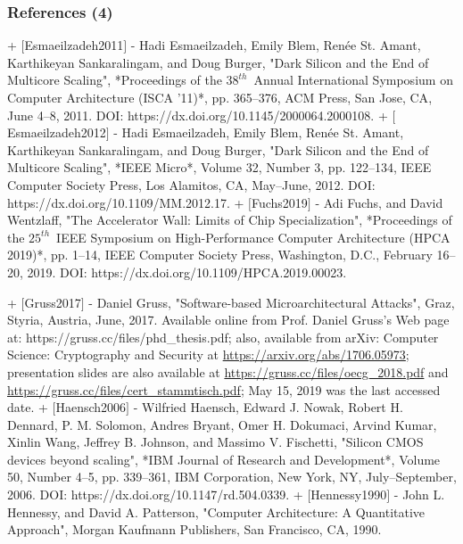 \begin{frame}
	\frametitle{References (4)}

+ $[$Esmaeilzadeh2011$]$
	- Hadi Esmaeilzadeh, Emily Blem, Ren{\'{e}}e {St. Amant}, Karthikeyan Sankaralingam, and Doug Burger, "Dark Silicon and the End of Multicore Scaling", *Proceedings of the $38^{th}$\ Annual International Symposium on Computer Architecture ({ISCA '11})*, pp. 365--376, {ACM} Press, San Jose, {CA}, June 4--8, 2011. DOI: https://dx.doi.org/10.1145/2000064.2000108.
+ $[$Esmaeilzadeh2012$]$
	- Hadi Esmaeilzadeh, Emily Blem, Ren{\'{e}}e {St. Amant}, Karthikeyan Sankaralingam, and Doug Burger, "Dark Silicon and the End of Multicore Scaling", *{IEEE} Micro*, Volume 32, Number 3, pp. 122--134, {IEEE} Computer Society Press, Los Alamitos, {CA}, May--June, 2012. DOI: https://dx.doi.org/10.1109/MM.2012.17.
+ $[$Fuchs2019$]$
	- Adi Fuchs, and David Wentzlaff, "The Accelerator Wall: Limits of Chip Specialization", *Proceedings of the $25^{th}$\ {IEEE} Symposium on High-Performance Computer Architecture ({HPCA} 2019)*, pp. 1--14, {IEEE} Computer Society Press, Washington, {D.C.}, February 16--20, 2019. DOI: https://dx.doi.org/10.1109/HPCA.2019.00023.



+ $[$Gruss2017$]$
	- Daniel Gruss, "Software-based Microarchitectural Attacks", Graz, Styria, Austria, June, 2017. Available online from Prof. Daniel Gruss's Web page at: https://gruss.cc/files/phd_thesis.pdf; also, available from arXiv: Computer Science: Cryptography and Security at \url{https://arxiv.org/abs/1706.05973}; presentation slides are also available at \url{https://gruss.cc/files/oecg_2018.pdf} and \url{https://gruss.cc/files/cert_stammtisch.pdf}; May 15, 2019 was the last accessed date.
+ $[$Haensch2006$]$
	- Wilfried Haensch, Edward J. Nowak, Robert H. Dennard, P. M. Solomon, Andres Bryant, Omer H. Dokumaci, Arvind Kumar, Xinlin Wang, Jeffrey B. Johnson, and Massimo V. Fischetti, "Silicon {CMOS} devices beyond scaling", *{IBM} Journal of Research and Development*, Volume 50, Number 4--5, pp. 339--361, {IBM} Corporation, New York, {NY}, July--September, 2006. DOI: https://dx.doi.org/10.1147/rd.504.0339.
+ $[$Hennessy1990$]$
	- John L. Hennessy, and David A. Patterson, "Computer Architecture: A Quantitative Approach", Morgan Kaufmann Publishers, San Francisco, {CA}, 1990.



\end{frame}



















